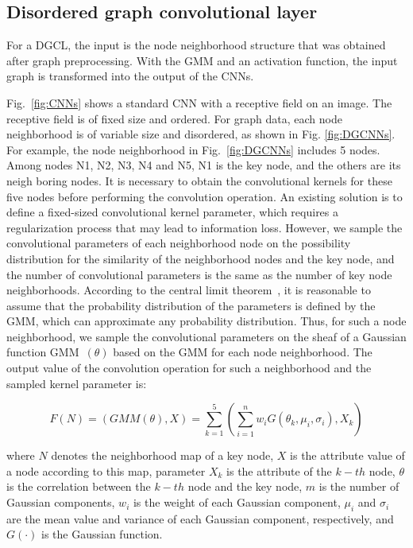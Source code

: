 \documentclass[11pt]{article}
\begin{document}
\subsection{Disordered graph convolutional layer}
For a DGCL, the input is the node neighborhood structure that was obtained after graph preprocessing. With the GMM and an activation function, the input graph is transformed into the output of the CNNs.

Fig.~\ref{fig:CNNs} shows a standard CNN with a receptive field on an image. The receptive field is of fixed size and ordered. For graph data, each node neighborhood is of variable size and disordered, as shown in Fig. \ref{fig:DGCNNs}. For example, the node neighborhood in Fig.~\ref{fig:DGCNNs} includes 5 nodes. Among nodes N1, N2, N3, N4 and N5, N1 is the key node, and the others are its neigh boring nodes. It is necessary to obtain the convolutional kernels for these five nodes before performing the convolution operation. An existing solution is to define a fixed-sized convolutional kernel parameter, which requires a regularization process that may lead to information loss. However, we sample the convolutional parameters of each neighborhood node on the possibility distribution for the similarity of the neighborhood nodes and the key node, and the number of convolutional parameters is the same as the number of key node neighborhoods. According to the central limit theorem~\cite{Cs2002Almost}, it is reasonable to assume that the probability distribution of the parameters is defined by the GMM, which can approximate any probability distribution. Thus, for such a node neighborhood, we sample the convolutional parameters on the sheaf of a Gaussian function GMM~$(\theta)$ based on the GMM for each node neighborhood. The output value of the convolution operation for such a neighborhood and the sampled kernel parameter is:

\begin{equation}
F(N) =(GMM(\theta),X) = \sum_{k=1}^5 (\sum_{i=1}^n w_iG(\theta_k,\mu_i,\sigma_i),X_k)
\end{equation}

where $N$ denotes the neighborhood map of a key node, $X$ is the attribute value of a node according to this map, parameter $X_k$ is the attribute of the $k-th$ node, $\theta$ is the correlation between the $k-th$ node and the key node, $m$ is the number of Gaussian components, $w_i$ is the weight of each Gaussian component, $\mu_i$ and $\sigma_i$ are the mean value and variance of each Gaussian component, respectively, and $G(\cdot)$ is the Gaussian function.
\end{document}
